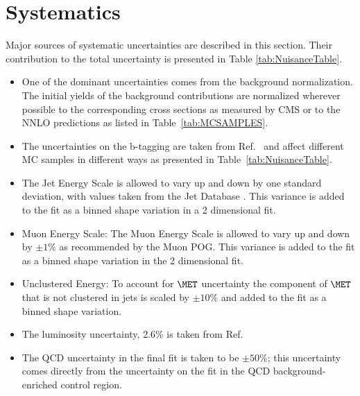 \section{Systematics}\label{Syst}

Major sources of systematic uncertainties are described in this section. 
Their contribution to the total uncertainty is presented in Table \ref{tab:NuisanceTable}. 


\begin{itemize}
\item One of the dominant uncertainties comes from the background normalization. 
The initial yields of the background contributions are normalized wherever possible to the 
corresponding cross sections as measured by CMS or to the NNLO predictions as listed in 
Table~\ref{tab:MCSAMPLES}. 
\item The uncertainties on the b-tagging are taken from Ref.~\cite{BTAGNOTE} and affect different 
MC samples in different ways as presented in Table~\ref{tab:NuisanceTable}. 
\item The Jet Energy Scale is allowed to vary up and down by one standard deviation, with values taken from the Jet Database \cite{}.
This variance is added to the fit as a binned shape variation in a 2 dimensional fit.
\item Muon Energy Scale: The Muon Energy Scale is allowed to vary up and down by $\pm 1 \%$ as recommended by the Muon POG. This variance is added to the fit as a binned shape variation in the 2 dimensional fit.
\item Unclustered Energy: To account for $\MET$ uncertainty the component of $\MET$ that is not clustered in jets is scaled by $\pm10\%$ and added to the fit as a binned shape variation.
\item The luminosity uncertainty, 2.6\% is taken from Ref.~\cite{LUMI}
\item The QCD uncertainty in the 
final fit is taken to be $\pm50\%$; this uncertainty comes directly from the uncertainty on the
fit in the QCD background-enriched control region.
\end{itemize}


